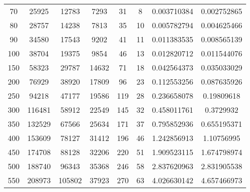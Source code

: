 \documentclass[conference]{acmsiggraph}
\begin{document}
\begin{table}[b]
{{\begin{minipage}{\textwidth}
\begin{tabular}{cccccccc}
    70                   & 25925              & 12783           & 7293          & 31                & 8               & 0.003710384               & 0.002752865             \\
    80                   & 28757              & 14238           & 7813          & 35                & 10              & 0.005782794               & 0.004625466             \\
    90                   & 34580              & 17543           & 9202          & 41                & 11              & 0.011383535               & 0.008565139             \\
    100                  & 38704              & 19375           & 9854          & 46                & 13              & 0.012820712               & 0.011544076             \\
    150                  & 58323              & 29787           & 14632         & 71                & 18              & 0.042564373               & 0.035033029             \\
    200                  & 76929              & 38920           & 17809         & 96                & 23              & 0.112553256               & 0.087635926             \\
    250                  & 94218              & 47177           & 19586         & 119               & 28              & 0.236658078               & 0.19809618              \\
    300                  & 116481             & 58912           & 22549         & 145               & 32              & 0.458011761               & 0.3729932               \\
    350                  & 132529             & 67566           & 25634         & 171               & 37              & 0.795852936               & 0.655195371             \\
    400                  & 153609             & 78127           & 31412         & 196               & 46              & 1.242856913               & 1.10756995              \\
    450                  & 174708             & 88128           & 32206         & 220               & 51              & 1.909523115               & 1.674798974             \\
    500                  & 188740             & 96343           & 35368         & 246               & 58              & 2.837620963               & 2.831905538             \\
    550                  & 208973             & 105802          & 37923         & 270               & 63              & 4.026630142               & 4.657466973             \\

\end{tabular}
\end{minipage}}}
\end{table}
\end{document}
